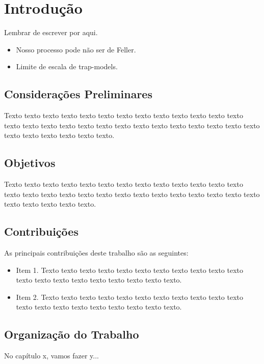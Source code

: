 \chapter{Introdução}
\label{cap:introducao}

Lembrar de escrever por aqui.
\begin{itemize}
\item Nosso processo pode não ser de Feller.
\item Limite de escala de trap-models.
\end{itemize}

\section{Considerações Preliminares}
\label{sec:consideracoes_preliminares}

Texto texto texto texto texto texto texto texto texto texto texto texto texto
texto texto texto texto texto texto texto texto texto texto texto texto texto
texto texto texto texto texto texto texto.


\section{Objetivos}
\label{sec:objetivo}

Texto texto texto texto texto texto texto texto texto texto texto texto texto
texto texto texto texto texto texto texto texto texto texto texto texto texto
texto texto texto texto texto texto.

\section{Contribuições}
\label{sec:contribucoes}

As principais contribuições deste trabalho são as seguintes:

\begin{itemize}
  \item Item 1. Texto texto texto texto texto texto texto texto texto texto
  texto texto texto texto texto texto texto texto texto texto.

  \item Item 2. Texto texto texto texto texto texto texto texto texto texto
  texto texto texto texto texto texto texto texto texto texto.

\end{itemize}

\section{Organização do Trabalho}
\label{sec:organizacao_trabalho}

No capítulo x, vamos fazer y...


